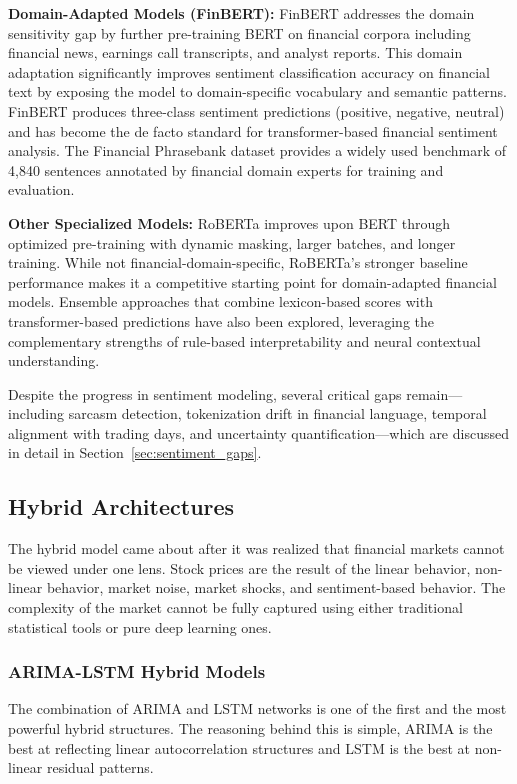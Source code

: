 \textbf{Domain-Adapted Models (FinBERT):}
FinBERT \cite{araci2019} addresses the domain sensitivity gap by further pre-training BERT on financial corpora including financial news, earnings call transcripts, and analyst reports. This domain adaptation significantly improves sentiment classification accuracy on financial text by exposing the model to domain-specific vocabulary and semantic patterns. FinBERT produces three-class sentiment predictions (positive, negative, neutral) and has become the de facto standard for transformer-based financial sentiment analysis. The Financial Phrasebank dataset \cite{malo2014} provides a widely used benchmark of 4,840 sentences annotated by financial domain experts for training and evaluation.

\textbf{Other Specialized Models:}
RoBERTa \cite{liu2019} improves upon BERT through optimized pre-training with dynamic masking, larger batches, and longer training. While not financial-domain-specific, RoBERTa's stronger baseline performance makes it a competitive starting point for domain-adapted financial models. Ensemble approaches that combine lexicon-based scores with transformer-based predictions have also been explored, leveraging the complementary strengths of rule-based interpretability and neural contextual understanding.

Despite the progress in sentiment modeling, several critical gaps remain---including sarcasm detection, tokenization drift in financial language, temporal alignment with trading days, and uncertainty quantification---which are discussed in detail in Section~\ref{sec:sentiment_gaps}.

\subsection{Hybrid Architectures}

The hybrid model came about after it was realized that financial markets cannot be viewed under one lens. Stock prices are the result of the linear behavior, non-linear behavior, market noise, market shocks, and sentiment-based behavior. The complexity of the market cannot be fully captured using either traditional statistical tools or pure deep learning ones.

\subsubsection{ARIMA-LSTM Hybrid Models}

The combination of ARIMA and LSTM networks is one of the first and the most powerful hybrid structures. The reasoning behind this is simple, ARIMA is the best at reflecting linear autocorrelation structures and LSTM is the best at non-linear residual patterns.

